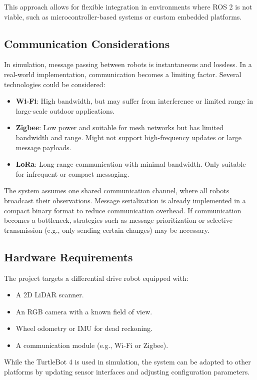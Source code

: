 This approach allows for flexible integration in environments where ROS 2 is not viable, such as microcontroller-based systems or custom embedded platforms.

\subsection{Communication Considerations}\label{sub:communication}
In simulation, message passing between robots is instantaneous and lossless. 
In a real-world implementation, communication becomes a limiting factor. 
Several technologies could be considered:

\begin{itemize}
  \item \textbf{Wi-Fi}: High bandwidth, but may suffer from interference or limited range in large-scale outdoor applications.
  \item \textbf{Zigbee}: Low power and suitable for mesh networks but has limited bandwidth and range. Might not support high-frequency updates or large message payloads.
  \item \textbf{LoRa}: Long-range communication with minimal bandwidth. Only suitable for infrequent or compact messaging.
\end{itemize}

The system assumes one shared communication channel, where all robots broadcast their observations. 
Message serialization is already implemented in a compact binary format to reduce communication overhead. 
If communication becomes a bottleneck, strategies such as message prioritization or selective transmission (e.g., only sending certain changes) may be necessary.

\subsection{Hardware Requirements}
The project targets a differential drive robot equipped with:
\begin{itemize}
  \item A 2D LiDAR scanner.
  \item An RGB camera with a known field of view.
  \item Wheel odometry or IMU for dead reckoning.
  \item A communication module (e.g., Wi-Fi or Zigbee).
\end{itemize}

While the TurtleBot 4 is used in simulation, the system can be adapted to other platforms by updating sensor interfaces and adjusting configuration parameters.

